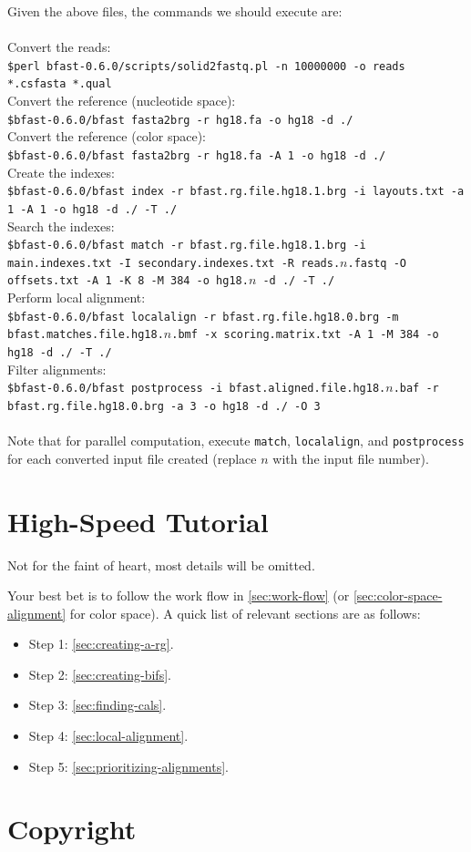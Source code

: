 \documentclass[a4paper,12pt]{book}
\newcommand{\Version}{0.6.0}
\begin{document}
Given the above files, the commands we should execute are:
\\\\
Convert the reads:\\
{\tt \scriptsize \$perl bfast-\Version{}/scripts/solid2fastq.pl -n 10000000 -o reads *.csfasta *.qual\\}
Convert the reference (nucleotide space):\\
{\tt \scriptsize \$bfast-\Version{}/bfast fasta2brg -r hg18.fa -o hg18 -d ./\\}
Convert the reference (color space):\\
{\tt \scriptsize \$bfast-\Version{}/bfast fasta2brg -r hg18.fa -A 1 -o hg18 -d ./\\}
Create the indexes:\\
{\tt \scriptsize \$bfast-\Version{}/bfast index -r bfast.rg.file.hg18.1.brg -i layouts.txt -a 1 -A 1 -o hg18 -d ./ -T ./\\}
Search the indexes:\\
{\tt \scriptsize \$bfast-\Version{}/bfast match -r bfast.rg.file.hg18.1.brg -i main.indexes.txt -I secondary.indexes.txt -R reads.$n$.fastq -O offsets.txt -A 1 -K 8 -M 384 -o hg18.$n$ -d ./ -T ./\\}
Perform local alignment:\\
{\tt \scriptsize \$bfast-\Version{}/bfast localalign -r bfast.rg.file.hg18.0.brg -m bfast.matches.file.hg18.$n$.bmf -x scoring.matrix.txt -A 1 -M 384 -o hg18 -d ./ -T ./\\}
Filter alignments:\\
{\tt \scriptsize \$bfast-\Version{}/bfast postprocess -i bfast.aligned.file.hg18.$n$.baf -r bfast.rg.file.hg18.0.brg -a 3 -o hg18 -d ./ -O 3\\}
\\
Note that for parallel computation, execute {\tt match}, {\tt localalign}, and {\tt postprocess} for each converted input file created (replace $n$ with the input file number).

\section{High-Speed Tutorial}
\label{sec:high-speed-tutorial}
Not for the faint of heart, most details will be omitted.

Your best bet is to follow the work flow in \autoref{sec:work-flow} (or \autoref{sec:color-space-alignment} for color space).
A quick list of relevant sections are as follows:
\begin{itemize}
	\item Step 1: \autoref{sec:creating-a-rg}.
	\item Step 2: \autoref{sec:creating-bifs}.
	\item Step 3: \autoref{sec:finding-cals}.
	\item Step 4: \autoref{sec:local-alignment}.
	\item Step 5: \autoref{sec:prioritizing-alignments}.
\end{itemize}
\section{Copyright}


{}


\end{document}
